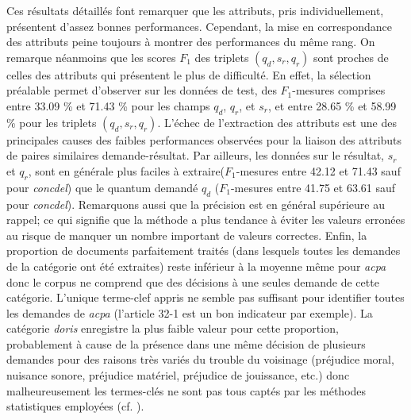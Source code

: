 Ces résultats détaillés font remarquer que les attributs, pris individuellement, présentent d'assez bonnes performances. Cependant, la mise en correspondance des attributs peine toujours à montrer des performances du même rang. On remarque néanmoins que les scores $F_1$ des triplets $(q_d,s_r, q_r)$ sont proches de celles des attributs qui présentent le plus de difficulté. En effet, la sélection préalable permet d'observer sur les données de test, des $F_1$-mesures comprises entre 33.09 \% et 71.43 \% pour les champs $q_d$, $q_r$, et $s_r$, et entre 28.65 \% et 58.99 \% pour les triplets $(q_d,s_r, q_r)$. L'échec de l'extraction des attributs est une des principales causes des faibles performances observées pour la liaison des attributs de paires similaires demande-résultat. Par ailleurs, les données sur le résultat, $s_r$ et $q_r$, sont en générale plus faciles à extraire($F_1$-mesures entre 42.12 et 71.43 sauf pour \textit{concdel}) que le quantum demandé $q_d$ ($F_1$-mesures entre 41.75 et 63.61 sauf pour \textit{concdel}). %
Remarquons aussi que la précision est en général supérieure au rappel; ce qui signifie que la méthode a plus tendance à éviter les valeurs erronées au risque de manquer un nombre important de valeurs correctes. Enfin, la proportion de documents parfaitement traités (dans lesquels toutes les demandes de la catégorie ont été extraites) reste inférieur à la moyenne même pour \textit{acpa} donc le corpus ne comprend que des décisions à une seules demande de cette catégorie. L'unique terme-clef appris ne semble pas suffisant pour identifier toutes les demandes de \textit{acpa} (l'\og article 32-1 \fg{} est un bon indicateur par exemple). La catégorie \textit{doris} enregistre la plus faible valeur pour cette proportion, probablement à cause de la présence dans une même décision de plusieurs demandes pour des raisons très variés du trouble du voisinage (préjudice moral, nuisance sonore, préjudice matériel, préjudice de jouissance, etc.) donc malheureusement les termes-clés ne sont pas tous captés par les méthodes statistiques employées (cf. ). %

